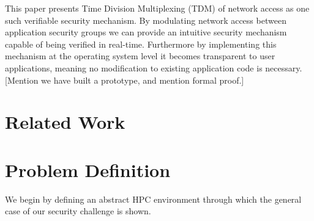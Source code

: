 \documentclass{article}
\begin{document}
This paper presents Time Division Multiplexing (TDM) of network access as one such verifiable security mechanism. By modulating network access between application security groups we can provide an intuitive security mechanism capable of being verified in real-time. Furthermore by implementing this mechanism at the operating system level it becomes transparent to user applications, meaning no modification to existing application code is necessary. [Mention we have built a prototype, and mention formal proof.]
\section{Related Work}
\section{Problem Definition}

We begin by defining an abstract HPC environment through which the general case of our security challenge is shown.
\end{document}
